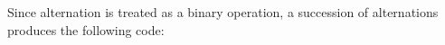 \begin{center}
\tabletail{}
\tablelasttail{}
\begin{supertabular}{|m{1.9073598in}|m{2.75596in}|}

\end{supertabular}
\end{center}

Since alternation is treated as a binary operation, a succession of
alternations produces the following code:


